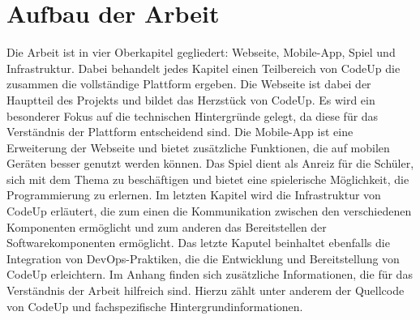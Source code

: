 \documentclass[main.tex]{subfiles}
\begin{document}
    \section{Aufbau der Arbeit}
    Die Arbeit ist in vier Oberkapitel gegliedert: Webseite, Mobile-App, Spiel und Infrastruktur.
    Dabei behandelt jedes Kapitel einen Teilbereich von CodeUp die zusammen die vollständige Plattform ergeben.
    Die Webseite ist dabei der Hauptteil des Projekts und bildet das Herzstück von CodeUp.
    Es wird ein besonderer Fokus auf die technischen Hintergründe gelegt, da diese für das Verständnis der Plattform entscheidend sind.
    Die Mobile-App ist eine Erweiterung der Webseite und bietet zusätzliche Funktionen, die auf mobilen Geräten besser genutzt werden können.
    Das Spiel dient als Anreiz für die Schüler, sich mit dem Thema zu beschäftigen und bietet eine spielerische Möglichkeit, die Programmierung zu erlernen.
    Im letzten Kapitel wird die Infrastruktur von CodeUp erläutert, die zum einen die Kommunikation zwischen den verschiedenen Komponenten ermöglicht und zum anderen das Bereitstellen der Softwarekomponenten ermöglicht.
    Das letzte Kaputel beinhaltet ebenfalls die Integration von DevOps-Praktiken, die die Entwicklung und Bereitstellung von CodeUp erleichtern.
    Im Anhang finden sich zusätzliche Informationen, die für das Verständnis der Arbeit hilfreich sind.
    Hierzu zählt unter anderem der Quellcode von CodeUp und fachspezifische Hintergrundinformationen.
\end{document}
